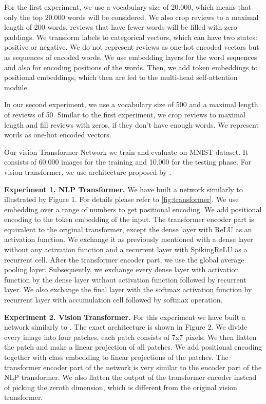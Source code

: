 \documentclass{article}
\begin{document}
For the first experiment, we use a vocabulary size of 20.000, which means that only the top 20.000 words will be considered. We also crop reviews to a maximal length of 200 words, reviews that have fewer words will be filled with zero paddings. We transform labels to categorical vectors, which can have two states: positive or negative. We do not represent reviews as one-hot encoded vectors but as sequences of encoded words. We use embedding layers for the word sequences and also for encoding positions of the words. Then, we add token embeddings to positional embeddings, which then are fed to the multi-head self-attention module.

In our second experiment, we use a vocabulary size of 500 and a maximal length of reviews of 50. Similar to the first experiment, we crop reviews to maximal length and fill reviews with zeros, if they don't have enough words. We represent words as one-hot encoded vectors.

Our vision Transformer Network we train and evaluate on MNIST dataset. It consists of 60.000 images for the training and 10.000 for the testing phase. For vision transformer, we use architecture proposed by \cite{vision_transformer}.

\textbf{Experiment 1. NLP Transformer.} We have built a network similarly to \cite{transformer} illustrated by Figure 1. For details please refer to \ref{fig:transformer}. We use embedding over a range of numbers to get positional encoding. We add positional encoding to the token embedding of the input. The transformer encoder part is equivalent to the original transformer, except the dense layer with ReLU as an activation function. We exchange it as previously mentioned with a dense layer without any activation function and a recurrent layer with SpikingReLU as a recurrent cell. After the transformer encoder part, we use the global average pooling layer. Subsequently, we exchange every dense layer with activation function by the dense layer without activation function followed by recurrent layer. We also exchange the final layer with the softmax activation function by recurrent layer with accumulation cell followed by softmax operation.

\textbf{Experiment 2. Vision Transformer.} For this experiment we have built a network similarly to \cite{vision_transformer}. The exact architecture is shown in Figure 2. We divide every image into four patches, each patch consists of 7x7 pixels. We then flatten the patch and make a linear projection of all patches. We add positional encoding together with class embedding to linear projections of the patches. The transformer encoder part of the network is very similar to the encoder part of the NLP transformer. We also flatten the output of the transformer encoder instead of picking the zeroth dimension, which is different from the original vision transformer.
\end{document}
